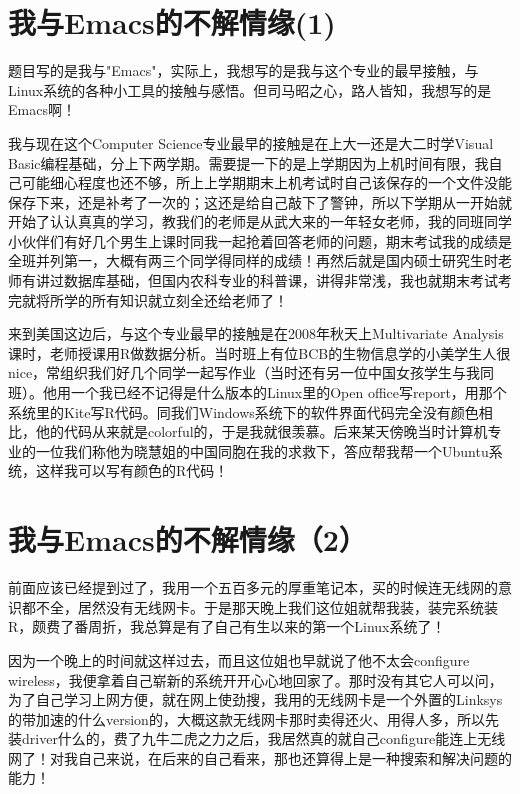 \documentclass[12pt]{book}
\begin{document}
\section{我与Emacs的不解情缘(1)}
\label{sec-6-1}

题目写的是我与"Emacs"，实际上，我想写的是我与这个专业的最早接触，与Linux系统的各种小工具的接触与感悟。但司马昭之心，路人皆知，我想写的是Emacs啊！

我与现在这个Computer Science专业最早的接触是在上大一还是大二时学Visual Basic编程基础，分上下两学期。需要提一下的是上学期因为上机时间有限，我自己可能细心程度也还不够，所上上学期期末上机考试时自己该保存的一个文件没能保存下来，还是补考了一次的；这还是给自己敲下了警钟，所以下学期从一开始就开始了认认真真的学习，教我们的老师是从武大来的一年轻女老师，我的同班同学小伙伴们有好几个男生上课时同我一起抢着回答老师的问题，期末考试我的成绩是全班并列第一，大概有两三个同学得同样的成绩！再然后就是国内硕士研究生时老师有讲过数据库基础，但国内农科专业的科普课，讲得非常浅，我也就期末考试考完就将所学的所有知识就立刻全还给老师了！

来到美国这边后，与这个专业最早的接触是在2008年秋天上Multivariate Analysis课时，老师授课用R做数据分析。当时班上有位BCB的生物信息学的小美学生人很nice，常组织我们好几个同学一起写作业（当时还有另一位中国女孩学生与我同班）。他用一个我已经不记得是什么版本的Linux里的Open office写report，用那个系统里的Kite写R代码。同我们Windows系统下的软件界面代码完全没有颜色相比，他的代码从来就是colorful的，于是我就很羡慕。后来某天傍晚当时计算机专业的一位我们称他为晓慧姐的中国同胞在我的求救下，答应帮我帮一个Ubuntu系统，这样我可以写有颜色的R代码！


\section{我与Emacs的不解情缘（2）}
\label{sec-6-2}

前面应该已经提到过了，我用一个五百多元的厚重笔记本，买的时候连无线网的意识都不全，居然没有无线网卡。于是那天晚上我们这位姐就帮我装，装完系统装R，颇费了番周折，我总算是有了自己有生以来的第一个Linux系统了！

因为一个晚上的时间就这样过去，而且这位姐也早就说了他不太会configure wireless，我便拿着自己崭新的系统开开心心地回家了。那时没有其它人可以问，为了自己学习上网方便，就在网上使劲搜，我用的无线网卡是一个外置的Linksys的带加速的什么version的，大概这款无线网卡那时卖得还火、用得人多，所以先装driver什么的，费了九牛二虎之力之后，我居然真的就自己configure能连上无线网了！对我自己来说，在后来的自己看来，那也还算得上是一种搜索和解决问题的能力！
\end{document}

